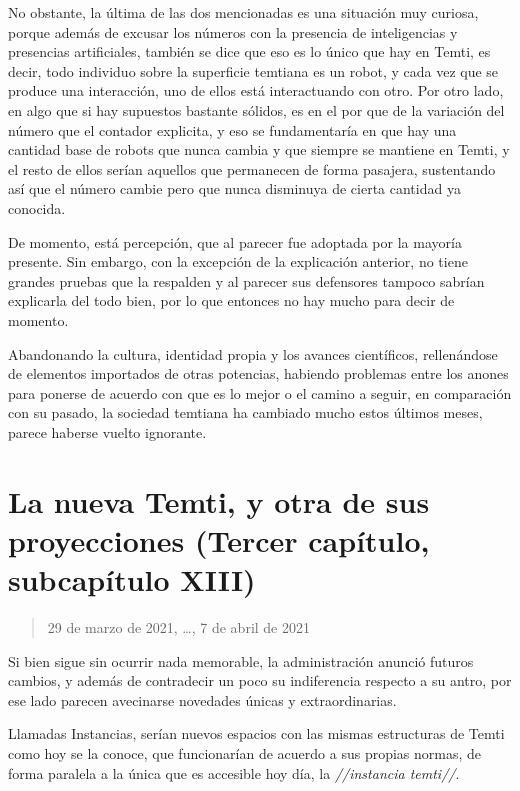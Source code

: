\documentclass[
  spanish,
]{book}
\begin{document}
No obstante, la última de las dos mencionadas es una situación muy curiosa, porque además de excusar los números con la presencia de inteligencias y presencias artificiales, también se dice que eso es lo único que hay en Temti, es decir, todo individuo sobre la superficie temtiana es un robot, y cada vez que se produce una interacción, uno de ellos está interactuando con otro. Por otro lado, en algo que si hay supuestos bastante sólidos, es en el por que de la variación del número que el contador explicita, y eso se fundamentaría en que hay una cantidad base de robots que nunca cambia y que siempre se mantiene en Temti, y el resto de ellos serían aquellos que permanecen de forma pasajera, sustentando así que el número cambie pero que nunca disminuya de cierta cantidad ya conocida.

De momento, está percepción, que al parecer fue adoptada por la mayoría presente. Sin embargo, con la excepción de la explicación anterior, no tiene grandes pruebas que la respalden y al parecer sus defensores tampoco sabrían explicarla del todo bien, por lo que entonces no hay mucho para decir de momento.

Abandonando la cultura, identidad propia y los avances científicos, rellenándose de elementos importados de otras potencias, habiendo problemas entre los anones para ponerse de acuerdo con que es lo mejor o el camino a seguir, en comparación con su pasado, la sociedad temtiana ha cambiado mucho estos últimos meses, parece haberse vuelto ignorante.

\hypertarget{la-nueva-temti-y-otra-de-sus-proyecciones-tercer-capuxedtulo-subcapuxedtulo-xiii}{%
\section{La nueva Temti, y otra de sus proyecciones (Tercer capítulo, subcapítulo XIII)}\label{la-nueva-temti-y-otra-de-sus-proyecciones-tercer-capuxedtulo-subcapuxedtulo-xiii}}

\begin{quote}
29 de marzo de 2021, \ldots, 7 de abril de 2021
\end{quote}

Si bien sigue sin ocurrir nada memorable, la administración anunció futuros cambios, y además de contradecir un poco su indiferencia respecto a su antro, por ese lado parecen avecinarse novedades únicas y extraordinarias.

Llamadas Instancias, serían nuevos espacios con las mismas estructuras de Temti como hoy se la conoce, que funcionarían de acuerdo a sus propias normas, de forma paralela a la única que es accesible hoy día, la \emph{//instancia temti//}.
\end{document}
